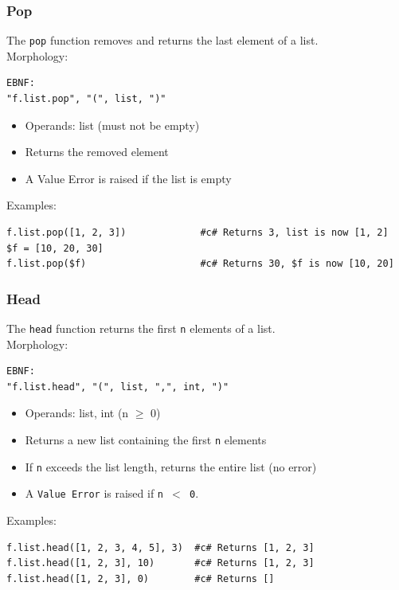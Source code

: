 \subsubsection{Pop}
The \texttt{pop} function removes and returns the last element of a list.\\
Morphology:
\begin{verbatim}
EBNF:
"f.list.pop", "(", list, ")"
\end{verbatim}
\begin{itemize}
\item Operands: list (must not be empty)
\item Returns the removed element
\item A Value Error is raised if the list is empty
\end{itemize}
Examples:
\begin{verbatim}
f.list.pop([1, 2, 3])             #c# Returns 3, list is now [1, 2]
$f = [10, 20, 30]
f.list.pop($f)                    #c# Returns 30, $f is now [10, 20]
\end{verbatim}

\subsubsection{Head}
The \texttt{head} function returns the first \texttt{n} elements of a list.\\
Morphology:
\begin{verbatim}
EBNF:
"f.list.head", "(", list, ",", int, ")"
\end{verbatim}
\begin{itemize}
\item Operands: list, int (n $\geq$ 0)
\item Returns a new list containing the first \texttt{n} elements
\item If \texttt{n} exceeds the list length, returns the entire list (no error)
\item A \texttt{Value Error} is raised if \texttt{n $<$ 0}.
\end{itemize}
Examples:
\begin{verbatim}
f.list.head([1, 2, 3, 4, 5], 3)  #c# Returns [1, 2, 3]
f.list.head([1, 2, 3], 10)       #c# Returns [1, 2, 3]
f.list.head([1, 2, 3], 0)        #c# Returns []
\end{verbatim}

